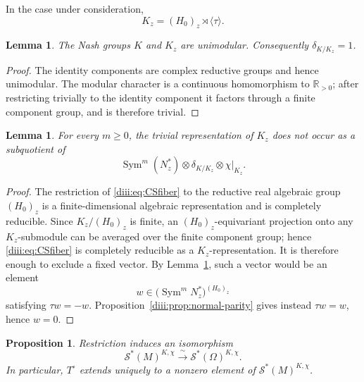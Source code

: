 \documentclass[10pt,a4paper]{amsart}
\numberwithin{equation}{section}
\newtheorem{proposition}[theorem]{Proposition}
\newtheorem{lemma}[theorem]{Lemma}
\newcommand{\Sym}{\operatorname{Sym}}
\newcommand{\cS}{\mathcal S}
\begin{document}
In the case under consideration,
\[
  K_z=(H_0)_z\rtimes\langle\tau\rangle.
\]

\begin{lemma}\label{diii:lem:modular}
The Nash groups $K$ and $K_z$ are unimodular.  Consequently
$\delta_{K/K_z}=1$.
\end{lemma}

\begin{proof}
The identity components are complex reductive groups and hence unimodular.  The modular character is a continuous homomorphism to $\mathbb R_{>0}$; after restricting trivially to the identity component it factors through a finite component group, and is therefore trivial.
\end{proof}

\begin{lemma}\label{diii:lem:CScondition}
For every $m\ge0$, the trivial representation of $K_z$ does not occur as a subquotient of
\begin{equation}\label{diii:eq:CSfiber}
  \Sym^m(N_z^*)\otimes\delta_{K/K_z}\otimes\chi|_{K_z}.
\end{equation}
\end{lemma}

\begin{proof}
The restriction of \eqref{diii:eq:CSfiber} to the reductive real algebraic group
$(H_0)_z$ is a finite-dimensional algebraic representation and is completely reducible.  Since $K_z/(H_0)_z$ is finite, an $(H_0)_z$-equivariant projection onto any $K_z$-submodule can be averaged over the finite component group; hence \eqref{diii:eq:CSfiber} is completely reducible as a $K_z$-representation.  It is therefore enough to exclude a fixed vector.  By Lemma~\ref{diii:lem:modular}, such a vector would be an element
\[
  w\in\bigl(\Sym^mN_z^*\bigr)^{(H_0)_z}
\]
satisfying $\tau w=-w$.  Proposition~\ref{diii:prop:normal-parity} gives instead
$\tau w=w$, hence $w=0$.
\end{proof}

\begin{proposition}\label{diii:prop:automatic-extension}
Restriction induces an isomorphism
\begin{equation}\label{diii:eq:restriction-iso}
  \cS^*(M)^{K,\chi}
  \xrightarrow{\ \sim\ }
  \cS^*(\Omega)^{K,\chi}.
\end{equation}
In particular, $T^\circ$ extends uniquely to a nonzero element of
$\cS^*(M)^{K,\chi}$.
\end{proposition}
\end{document}
